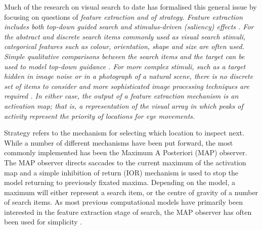 \documentclass[man]{apa6}
\begin{document}
Much of the research on visual search to date has formalised this general issue by focusing on questions of  \itshape feature extraction \normalfont  and of \itshape strategy\normalfont. Feature extraction includes both top-down guided search \parencite{wolfe2007, zelinsky2008} and stimulus-driven (saliency) effects \parencite{itti-koch2000, gao2008, itti-baldi2009}.  For the abstract and discrete search items commonly used as visual search stimuli, categorical features such as colour, orientation, shape and size are often used. Simple qualitative comparisons between the search items and the target can be used to model top-down guidance \parencite{pomplun2003, rutishauser-koch2007}. For more complex stimuli, such as a target hidden in image noise or in a photograph of a natural scene, there is no discrete set of items to consider and more sophisticated image processing techniques are required \parencite{rao2002, zelinsky2008, pomplun2007,  hwang2009, tavassoli2009}. In either case, the output of a feature extraction mechanism is an activation map; that is, a representation of the visual array in which peaks of activity represent the priority of locations for eye movements.

Strategy refers to the mechanism for selecting which location to inspect next. While a number of different mechanisms have been put forward, the most commonly implemented has been the Maximum A Posteriori (MAP) observer. The MAP observer directs saccades to the current maximum of the activation map and a simple inhibition of return (IOR) mechanism is used to stop the model returning to previously fixated maxima. Depending on the model, a maximum will either represent a search item, or the centre of gravity of a number of search items. As most previous computational models have primarily been interested in the feature extraction stage of search, the MAP observer has often been used for simplicity \parencite{itti-koch2000, rao2002, pomplun2003, rutishauser-koch2007, clarke2009, zelinsky2008}.
\end{document}
